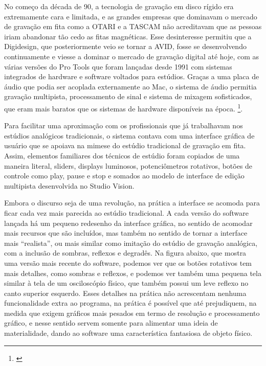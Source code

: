 No começo da década de 90, a tecnologia de gravação em disco rígido era extremamente cara e limitada, e as grandes empresas que dominavam o mercado de gravação em fita como a OTARI e a TASCAM não acreditavam que as pessoas iriam abandonar tão cedo as fitas magnéticas. Esse desinteresse permitiu que a Digidesign, que posteriormente veio se tornar a AVID, fosse se desenvolvendo continuamente e viesse a dominar o mercado de gravação digital até hoje, com as várias versões do Pro Tools que foram lançadas desde 1991 com sistemas integrados de hardware e software voltados para estúdios. Graças a uma placa de áudio que podia ser acoplada externamente ao Mac, o sistema de áudio permitia gravação multipista, processamento de sinal e sistema de mixagem sofisticados, que eram mais baratos que os sistemas de hardware disponíveis na época. \footnote{\cite{ChrisHalaby2011}}.

Para facilitar uma aproximação com os profissionais que já trabalhavam nos estúdios analógicos tradicionais, o sistema contava com uma interface gráfica de usuário que se apoiava na mimese do estúdio tradicional de gravação em fita. Assim, elementos familiares dos técnicos de estúdio foram copiados de uma maneira literal, sliders, displays luminosos, potenciômetros rotativos, botões de controle como play, pause e stop e somados ao modelo de interface de edição multipista desenvolvida no Studio Vision. 

Embora o discurso seja de uma revolução, na prática a interface se acomoda para ficar cada vez mais parecida ao estúdio tradicional. A cada versão do software lançada há um pequeno redesenho da interface gráfica, no sentido de acomodar mais recursos que são incluídos, mas também no sentido de tornar a interface mais “realista”, ou mais similar como imitação do estúdio de gravação analógica, com a inclusão de sombras, reflexos e degradês. Na figura abaixo, que mostra uma versão mais recente do software, podemos ver que os botões rotativos tem mais detalhes, como sombras e reflexos, e podemos ver também uma pequena tela similar à tela de um osciloscópio físico, que também possui um leve reflexo no canto superior esquerdo. Esses detalhes na prática não acrescentam nenhuma funcionalidade extra ao programa, na prática é possível que até prejudiquem, na medida que exigem gráficos mais pesados em termo de resolução e processamento gráfico, e nesse sentido servem somente para alimentar uma ideia de materialidade, dando ao software uma característica fantasiosa de objeto físico. 

